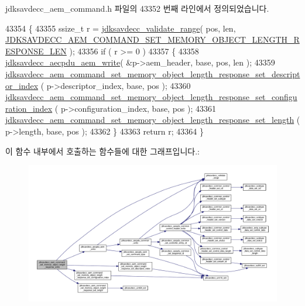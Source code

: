 jdksavdecc\+\_\+aem\+\_\+command.\+h 파일의 43352 번째 라인에서 정의되었습니다.


\begin{DoxyCode}
43354 \{
43355     ssize\_t r = \hyperlink{group__util_ga9c02bdfe76c69163647c3196db7a73a1}{jdksavdecc\_validate\_range}( pos, len, 
      \hyperlink{group__command__set__memory__object__length__response_gaa96d65ba1f96e254f46f0bf883ff9525}{JDKSAVDECC\_AEM\_COMMAND\_SET\_MEMORY\_OBJECT\_LENGTH\_RESPONSE\_LEN}
       );
43356     \textcolor{keywordflow}{if} ( r >= 0 )
43357     \{
43358         \hyperlink{group__aecpdu__aem_gad658e55771cce77cecf7aae91e1dcbc5}{jdksavdecc\_aecpdu\_aem\_write}( &p->aem\_header, base, pos, len );
43359         
      \hyperlink{group__command__set__memory__object__length__response_ga21593647fa64baa347b2739f1383adf9}{jdksavdecc\_aem\_command\_set\_memory\_object\_length\_response\_set\_descriptor\_index}
      ( p->descriptor\_index, base, pos );
43360         
      \hyperlink{group__command__set__memory__object__length__response_gad3c155742294bbb29f3a151b96e9c504}{jdksavdecc\_aem\_command\_set\_memory\_object\_length\_response\_set\_configuration\_index}
      ( p->configuration\_index, base, pos );
43361         \hyperlink{group__command__set__memory__object__length__response_ga334e67c0c07f77b30388542f92d1b186}{jdksavdecc\_aem\_command\_set\_memory\_object\_length\_response\_set\_length}
      ( p->length, base, pos );
43362     \}
43363     \textcolor{keywordflow}{return} r;
43364 \}
\end{DoxyCode}


이 함수 내부에서 호출하는 함수들에 대한 그래프입니다.\+:
\nopagebreak
\begin{figure}[H]
\begin{center}
\leavevmode
\includegraphics[width=350pt]{group__command__set__memory__object__length__response_gaf7840c5f1306b45636500e83e65eff20_cgraph}
\end{center}
\end{figure}


